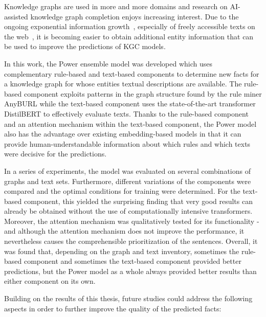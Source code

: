 Knowledge graphs are used in more and more domains and research on AI-assisted knowledge graph completion enjoys increasing interest. Due to the ongoing exponential information growth~\cite{}, especially of freely accessible texts on the web~\cite{}, it is becoming easier to obtain additional entity information that can be used to improve the predictions of KGC models.

In this work, the Power ensemble model was developed which uses complementary rule-based and text-based components to determine new facts for a knowledge graph for whose entities textual descriptions are available. The rule-based component exploits patterns in the graph structure found by the rule miner AnyBURL while the text-based component uses the state-of-the-art transformer DistilBERT to effectively evaluate texts. Thanks to the rule-based component and an attention mechanism within the text-based component, the Power model also has the advantage over existing embedding-based models in that it can provide human-understandable information about which rules and which texts were decisive for the predictions.

In a series of experiments, the model was evaluated on several combinations of graphs and text sets. Furthermore, different variations of the components were compared and the optimal conditions for training were determined. For the text-based component, this yielded the surprising finding that very good results can already be obtained without the use of computationally intensive transformers. Moreover, the attention mechanism was qualitatively tested for its functionality - and although the attention mechanism does not improve the performance, it nevertheless causes the comprehensible prioritization of the sentences. Overall, it was found that, depending on the graph and text inventory, sometimes the rule-based component and sometimes the text-based component provided better predictions, but the Power model as a whole always provided better results than either component on its own.

Building on the results of this thesis, future studies could address the following aspects in order to further improve the quality of the predicted facts:

